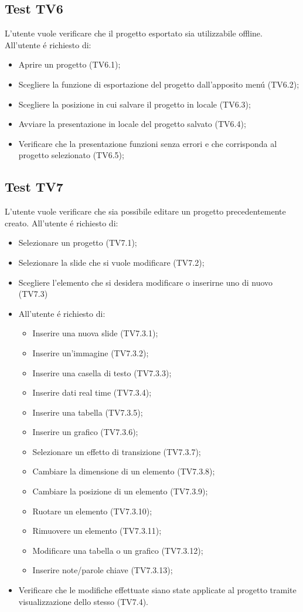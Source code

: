 \subsection{Test TV6}
L'utente vuole verificare che il progetto esportato sia utilizzabile offline. \newline
All'utente \'e richiesto di:
\begin{itemize}
	\item Aprire un progetto (TV6.1);
	\item Scegliere la funzione di esportazione del progetto dall'apposito men\'u (TV6.2);
	\item Scegliere la posizione in cui salvare il progetto in locale (TV6.3);
	\item Avviare la presentazione in locale del progetto salvato (TV6.4);
	\item Verificare che la presentazione funzioni senza errori e che corrisponda al progetto selezionato (TV6.5);
\end{itemize}

\subsection{Test TV7}
L'utente vuole verificare che sia possibile editare un progetto precedentemente creato. \newline
All'utente \'e richiesto di:
\begin{itemize}
	\item Selezionare un progetto (TV7.1);
	\item Selezionare la \gls{slide} che si vuole modificare (TV7.2);
	\item Scegliere l'elemento che si desidera modificare o inserirne uno di nuovo (TV7.3)
	\item[] All'utente \'e richiesto di:
	\begin{itemize}
		\item Inserire una nuova \gls{slide} (TV7.3.1);
		\item Inserire un'immagine (TV7.3.2);
		\item Inserire una casella di testo (TV7.3.3);
		\item Inserire dati \gls{real time} (TV7.3.4);
		\item Inserire una tabella (TV7.3.5);
		\item Inserire un grafico (TV7.3.6);
		\item Selezionare un effetto di transizione (TV7.3.7);
		\item Cambiare la dimensione di un elemento (TV7.3.8);
		\item Cambiare la posizione di un elemento (TV7.3.9);
		\item Ruotare un elemento (TV7.3.10);
		\item Rimuovere un elemento (TV7.3.11);
		\item Modificare una tabella o un grafico (TV7.3.12);
		\item Inserire note/parole chiave (TV7.3.13);
	\end{itemize}
	\item Verificare che le modifiche effettuate siano state applicate al progetto tramite visualizzazione dello stesso (TV7.4).
\end{itemize}

